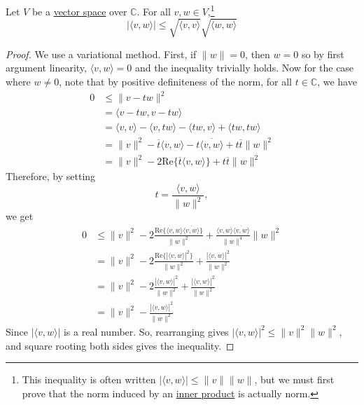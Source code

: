   \begin{theorem}
    \label{thm:cauchy-schwarz-inequality}
		Let $V$ be a \hyperref[def:vector-space]{vector space} over $\mathbb{C}$. For all $v, w \in V$,\footnote{This inequality is often written $| \langle v, w \rangle | \leq \|v\| \|w\|$, but we must first prove that the norm induced by an \hyperref[def:inner-product]{inner product} is actually norm. }
    \begin{equation}
			| \langle v, w \rangle | \leq \sqrt{\langle v, v \rangle} \sqrt{\langle w, w \rangle}
    \end{equation}
  \end{theorem}
	\begin{proof}
		We use a variational method. First, if $\|w\| = 0$, then $w = 0$ so by first argument linearity, $\langle v, w \rangle = 0$ and the inequality trivially holds. Now for the case where $w \neq 0 $, note that by positive definiteness of the norm, for all $t \in \mathbb{C}$, we have 
		\begin{align}
			0 & \leq \|v - tw\|^2 \\ 
				& = \langle v - tw, v - tw \rangle \\ 
				& = \langle v, v \rangle - \langle v, tw \rangle - \langle tw, v \rangle + \langle tw, tw \rangle \\ 
				& = \|v\|^2 - \overline{t} \langle v, w \rangle - t \overline{\langle v, w \rangle} + t \overline{t} \|w\|^2 \\ 
				& = \|v\|^2 - 2 \mathrm{Re}\{\overline{t} \langle v, w \rangle\} + t \overline{t} \|w\|^2
		\end{align}
		Therefore, by setting 
		\begin{equation}
			t = \frac{\langle v, w \rangle}{\|w\|^2}, 
		\end{equation}
		we get 
		\begin{align}
			0 & \leq \|v\|^2 - 2 \frac{\mathrm{Re}\{\langle v, w \rangle \overline{\langle v, w \rangle}\}}{\|w\|^2} + \frac{\langle v, w \rangle \overline{\langle v, w \rangle}}{\|w\|^4} \|w\|^2 \\
				& = \|v\|^2 - 2 \frac{\mathrm{Re}\{|\langle v, w \rangle|^2\}}{\|w\|^2} + \frac{|\langle v, w \rangle|^2}{\|w\|^2} \\
				& = \|v\|^2 - 2 \frac{|\langle v, w \rangle|^2}{\|w\|^2} + \frac{|\langle v, w \rangle|^2}{\|w\|^2} \\
				& = \|v\|^2 - \frac{|\langle v, w \rangle|^2}{\|w\|^2}
		\end{align}
		Since $|\langle v, w \rangle|$ is a real number. So, rearranging gives $|\langle v, w \rangle|^2 \leq \|v\|^2 \|w\|^2$, and square rooting both sides gives the inequality. 
	\end{proof}
